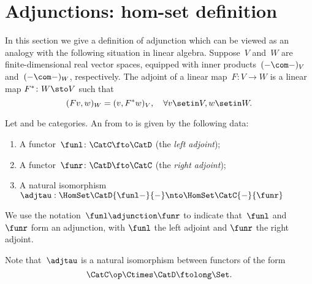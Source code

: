

\section{Adjunctions: hom-set definition}
In this section we give a definition of adjunction which can be viewed as an analogy with the following situation in linear algebra.
Suppose~$V$ and~$W$ are finite-dimensional real vector spaces, equipped with inner products~$(-\com -)_V$ and~$(- \com -)_W$, respectively.
The adjoint of a linear map~$F\colon V \to W$ is a linear map $F^*\colon W \sto V$ such that
\begin{equation}
    (Fv, w)
    _W = (v, F^*w)_V, \quad \forall v \setin V, w \setin W.
\end{equation}

\begin{ctdefinition}
    \label{def:adj-iso}
    \label{def:cat-adjunction-v1}
    Let \CatC and \CatD be categories.
    An \emph{} from \CatC to \CatD is given by the following data:
    \begin{enumerate}
        \item A functor~$\funl\colon \CatC \fto \CatD$ (the \emph{left adjoint});
        \item A functor~$\funr\colon \CatD \fto \CatC$ (the \emph{right adjoint});
        \item A natural isomorphism~$\adjtau: \HomSet\CatD{\funl -}{-} \nto \HomSet\CatC{-}{\funr}$
    \end{enumerate}
    We use the notation~$\funl \adjunction  \funr$ to indicate that~$\funl$ and~$\funr$ form an adjunction, with $\funl$ the left adjoint and $\funr$ the right adjoint.
\end{ctdefinition}

\begin{remark}
    Note that~$\adjtau$ is a natural isomorphism between functors of the form
    \begin{equation}
        \CatC\op \Ctimes \CatD \ftolong   \Set.
    \end{equation}
\end{remark}

